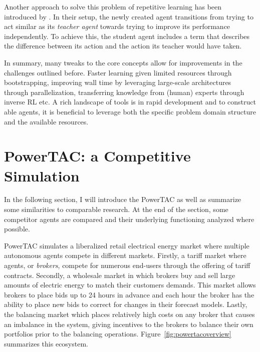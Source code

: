 Another approach to solve this problem of repetitive learning has been introduced by \citet{schmitt2018kickstarting}. In
their setup, the newly created agent transitions from trying to act similar as its \emph{teacher agent} towards trying
to improve its performance independently. To achieve this, the student agent includes a term that describes the
difference between its action and the action its teacher would have taken.

In summary, many tweaks to the core concepts allow for improvements in the challenges outlined before. Faster learning given limited
resources through bootstrapping, improving wall time by leveraging large-scale architectures through
parallelization, transferring knowledge from (human) experts through inverse \ac{RL} etc. A rich landscape of tools is
in rapid development and to construct able agents, it is beneficial to leverage both the specific problem domain
structure and the available resources.


\section{PowerTAC: a Competitive Simulation}%
\label{sec:powertac_a_competitive_simulation}


In the following section, I will introduce the \acl{PowerTAC} as well as summarize some similarities to comparable
research. At the end of the section, some competitor agents are compared and their underlying
functioning analyzed where possible.

\ac{PowerTAC} simulates a liberalized retail electrical energy market where multiple autonomous agents compete in
different markets. Firstly, a tariff market where agents, or \emph{brokers}, compete for numerous end-users through the
offering of tariff contracts. Secondly, a wholesale market in which brokers buy and sell large amounts of electric
energy to match their customers demands. This market allows brokers to place bids up to 24 hours in advance and each
hour the broker has the ability to place new bids to correct for changes in their forecast models. Lastly, the balancing
market which places relatively high costs on any broker that causes an imbalance in the system, giving incentives to the
brokers to balance their own portfolios prior to the balancing operations. Figure~\ref{fig:powertacoverview} summarizes
this ecosystem.

